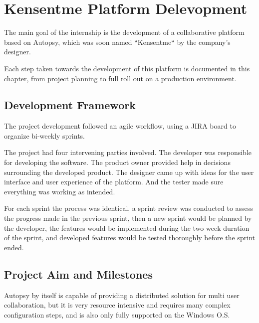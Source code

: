 
\chapter{Kensentme Platform Delevopment}
\label{ch:development}


The main goal of the internship is the development of a collaborative platform based on Autopsy, which was soon named ``Kensentme`` by the company's designer.

Each step taken towards the development of this platform is documented in this chapter, from project planning to full roll out on a production environment.

\section{Development Framework}

The project development followed an agile workflow, using a JIRA \cite{jira} board to organize bi-weekly sprints.

The project had four intervening parties involved. The developer was responsible for developing the software. The product owner provided help in decisions surrounding the developed product. 
The designer came up with ideas for the user interface and user experience of the platform. And the tester made sure everything was working as intended.

For each sprint the process was identical, a sprint review was conducted to assess the progress made in the previous sprint, then a new sprint would be planned by the developer, 
the features would be implemented during the two week duration of the sprint, and developed features would be tested thoroughly before the sprint ended.

\section{Project Aim and Milestones}

Autopsy by itself is capable of providing a distributed solution for multi user collaboration, but it is very resource intensive and requires many complex configuration steps,
and is also only fully supported on the Windows O.S.

